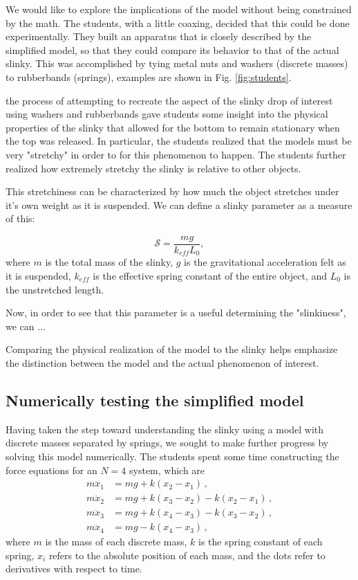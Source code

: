 \documentclass[aps,pre,10pt,superscriptaddress,showpacs,amsmath,amssymb,nofootinbib]{revtex4-1}
\newcommand{\nn}{\nonumber}
\newcommand{\FIGstudents}{
\begin{figure}[t]\center
\texttt{[image: FIGstudents.pdf]}
\caption{\label{fig:students} Students from the 2012 Compass Project summer program with model slinkies built out of washers and rubberbands.}
\end{figure}
}
\begin{document}
We would like to explore the implications of the model without being constrained by the math.  
The students, with a little coaxing, decided that this could be done experimentally.  They built an 
apparatus that is closely described by the simplified model, so that they could compare its behavior to that of the 
actual slinky.  This was accomplished by tying metal nuts and washers (discrete masses) to 
rubberbands (springs), examples are shown in Fig. \ref{fig:students}.  


the process of attempting to recreate the aspect of the slinky drop of interest using washers and rubberbands  
gave students some insight into the physical properties of the slinky that allowed for the bottom to  remain 
stationary when the top was released.  In particular, the students realized that the models must be very "stretchy"
in order to for this phenomenon to happen.  The students further realized how extremely stretchy the slinky is 
relative to other objects.

This stretchiness can be characterized by how much the object stretches
under it's own weight as it is suspended.   We can define a slinky parameter as a measure of this:

\begin{equation}
\mathcal{S}=\frac{m g}{k_{eff} L_0 },
\end{equation}
where $m$ is the total mass of the slinky, $g$ is the gravitational acceleration felt as it is suspended, $k_{eff}$ is 
the effective spring constant of the entire object, and $L_0$ is the unstretched length.  

Now, in order to see that this parameter is a useful determining the "slinkiness", we can ...


Comparing the physical realization of the model to the slinky 
helps emphasize the distinction between the model and the actual phenomenon of interest.

 

\subsection{Numerically testing the simplified model}
\label{subsec:forcesnumeric}
Having taken the step toward understanding the slinky using a model with
discrete masses separated by springs, we sought to make further progress by
solving this model numerically. The students spent some time constructing the
force equations for an $N=4$ system, which are
\begin{align} \label{eq:coupleddes}
m\ddot{x}_1 &= mg + k(x_2 - x_1)\,,
\nn\\
m\ddot{x}_2 &= mg + k(x_3 - x_2) - k(x_2 - x_1)
\,,\nn\\
m\ddot{x}_3 &= mg + k(x_4 - x_3) - k(x_3 - x_2)
\,,\nn\\
m\ddot{x}_4 &= mg                - k(x_4 - x_3)
\,,\end{align}
where $m$ is the mass of each discrete mass, $k$ is the spring constant of each
spring, $x_i$ refers to the absolute position of each mass, and the dots refer to
derivatives with respect to time.
\end{document}
